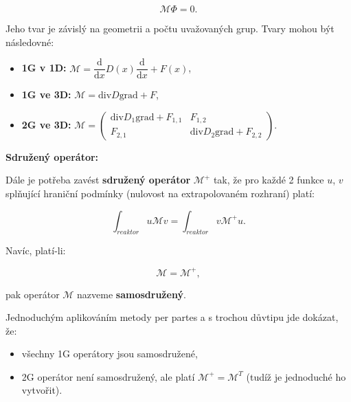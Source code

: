 \begin{equation}
  \boxed{
  \mathcal{M} \Phi = 0.
  \label{definice_maticovy_operator}}
\end{equation}

Jeho tvar je závislý na geometrii a počtu uvažovaných grup. Tvary mohou být následovné:

\begin{itemize}
  \item \textbf{1G v 1D:} \hspace{1.5cm} $\mathcal{M} = \dfrac{\text{d}}{\text{d}x} D(x) \dfrac{\text{d}}{\text{d}x} + F(x)$,
  \item \textbf{1G ve 3D:} \hspace{1.3cm} $\mathcal{M} = \text{div} D \text{grad} + F$,
  \item \textbf{2G ve 3D:} \hspace{1.3cm} $\mathcal{M} = \begin{pmatrix} \text{div} D_1 \text{grad} + F_{1,1} & F_{1,2} \\ F_{2,1} & \text{div} D_2 \text{grad} + F_{2,2} \end{pmatrix}$.
\end{itemize}

\textbf{Sdružený operátor:}

Dále je potřeba zavést \textbf{sdružený operátor} $\mathcal{M}^+$ tak, že pro každé 2 funkce $u$, $v$ splňující hraniční podmínky (nulovost na extrapolovaném rozhraní) platí:

\begin{equation}
  \boxed{
  \int_{reaktor} u \mathcal{M} v = \int_{reaktor} v \mathcal{M}^+ u.
  \label{definice_sdruzeny_operator}}
\end{equation}

Navíc, platí-li:

\begin{equation}
  \boxed{
  \mathcal{M} = \mathcal{M}^+,
  \label{definice_samosdruzeny_operator}}
\end{equation}

pak operátor $\mathcal{M}$ nazveme \textbf{samosdružený}.

Jednoduchým aplikováním metody per partes a s trochou důvtipu jde dokázat, že:

\begin{itemize}
  \item všechny 1G operátory jsou samosdružené,
  \item 2G operátor není samosdružený, ale platí $\mathcal{M}^+ = \mathcal{M}^T$ (tudíž je jednoduché ho vytvořit).
\end{itemize}

